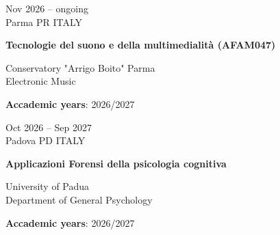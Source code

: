 \documentclass[7pt,a4paper]{article}
\begin{document}
\begin{mdframed}[
    backgroundcolor=entrygray,
    linecolor=entrygray,
    linewidth=0pt,
    innerleftmargin=6pt,
    innerrightmargin=6pt,
    innertopmargin=6pt,
    innerbottommargin=6pt,
    skipabove=0pt,
    skipbelow=0pt
]


\begin{minipage}[t]{0.28\textwidth}
\vspace{0pt}

Nov 2026 – ongoing
\\
\scriptsize Parma PR ITALY

\end{minipage}
\begin{minipage}[t]{0.68\textwidth}
\vspace{0pt}

\textbf{\normalsize Tecnologie del suono e della multimedialità (AFAM047)}


\par Conservatory "Arrigo Boito" Parma 
\\\small Electronic Music





\scriptsize \textbf{Accademic years}: 2026/2027

\end{minipage}

\vspace{0.25cm}
\end{mdframed}


\begin{mdframed}[
    backgroundcolor=white,
    linecolor=white,
    linewidth=0pt,
    innerleftmargin=6pt,
    innerrightmargin=6pt,
    innertopmargin=6pt,
    innerbottommargin=6pt,
    skipabove=0pt,
    skipbelow=0pt
]


\begin{minipage}[t]{0.28\textwidth}
\vspace{0pt}

Oct 2026 – Sep 2027
\\
\scriptsize Padova PD ITALY

\end{minipage}
\begin{minipage}[t]{0.68\textwidth}
\vspace{0pt}

\textbf{\normalsize Applicazioni Forensi della psicologia cognitiva}


\par University of Padua
\\\small Department of General Psychology





\scriptsize \textbf{Accademic years}: 2026/2027

\end{minipage}

\vspace{0.25cm}
\end{mdframed}
\end{document}

